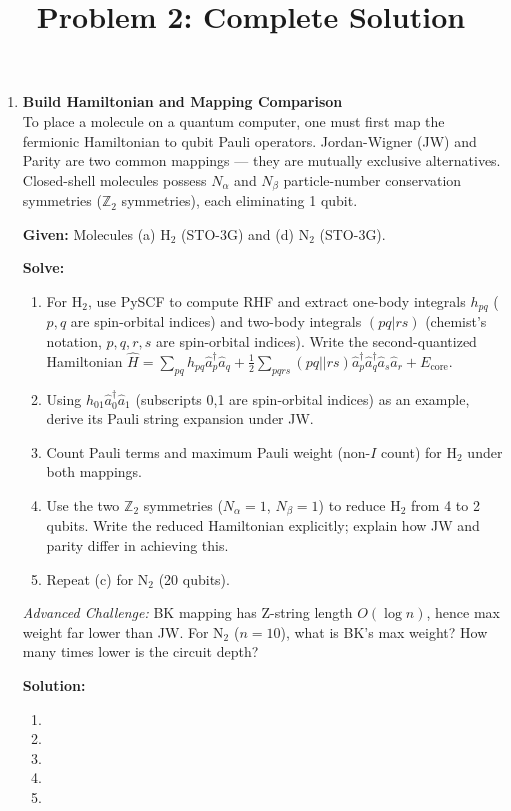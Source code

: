 \documentclass[fontset=mac]{ctexart}
\title{Problem 2: Complete Solution}
\date{}
\begin{document}
\maketitle

\begin{enumerate}
    \item \textbf{Build Hamiltonian and Mapping Comparison} \\ To place a molecule on a quantum computer, one must first map the fermionic Hamiltonian to qubit Pauli operators. Jordan-Wigner (JW) and Parity are two common mappings --- they are mutually exclusive alternatives. Closed-shell molecules possess $N_\alpha$ and $N_\beta$ particle-number conservation symmetries ($\mathbb{Z}_2$ symmetries), each eliminating 1 qubit.

    \textbf{Given:} Molecules (a) H$_2$ (STO-3G) and (d) N$_2$ (STO-3G).

    \textbf{Solve:}
    \begin{enumerate}[label=(\alph*)]
        \item For H$_2$, use PySCF to compute RHF and extract one-body integrals $h_{pq}$ ($p,q$ are spin-orbital indices) and two-body integrals $(pq|rs)$ (chemist's notation, $p,q,r,s$ are spin-orbital indices). Write the second-quantized Hamiltonian $\hat{H} = \sum_{pq} h_{pq}\hat{a}_p^\dagger\hat{a}_q + \frac{1}{2}\sum_{pqrs}(pq||rs)\hat{a}_p^\dagger\hat{a}_q^\dagger\hat{a}_s\hat{a}_r + E_{\text{core}}$.
        \item Using $h_{01}\hat{a}_0^\dagger\hat{a}_1$ (subscripts 0,1 are spin-orbital indices) as an example, derive its Pauli string expansion under JW.
        \item Count Pauli terms and maximum Pauli weight (non-$I$ count) for H$_2$ under both mappings.
        \item Use the two $\mathbb{Z}_2$ symmetries ($N_\alpha{=}1$, $N_\beta{=}1$) to reduce H$_2$ from 4 to 2 qubits. Write the reduced Hamiltonian explicitly; explain how JW and parity differ in achieving this.
        \item Repeat (c) for N$_2$ (20 qubits).
    \end{enumerate}

    \emph{Advanced Challenge:} BK mapping has Z-string length $O(\log n)$, hence max weight far lower than JW. For N$_2$ ($n{=}10$), what is BK's max weight? How many times lower is the circuit depth?

    \textbf{Solution:}
    \begin{enumerate}[label=(\alph*)]
        \item
        \item
        \item
        \item
        \item
    \end{enumerate}


\end{enumerate}
\end{document}
